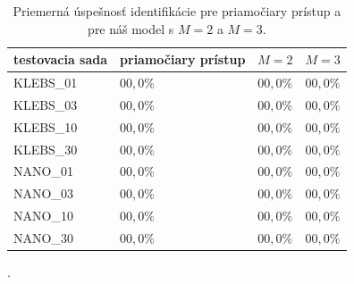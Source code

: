 \begin{table}[]
\centering
\caption{Priemerná úspešnosť identifikácie pre priamočiary prístup a pre náš model s $M=2$ a $M=3$.}
\label{tab:uspesnost_final}
\begin{tabular}{llll}
\hline
testovacia sada & priamočiary prístup & $M=2$     & $M=3$     \\ \hline
KLEBS\_01       & $00,0 \%$           & $00,0 \%$ & $00,0 \%$ \\
KLEBS\_03       & $00,0 \%$           & $00,0 \%$ & $00,0 \%$ \\
KLEBS\_10       & $00,0 \%$           & $00,0 \%$ & $00,0 \%$ \\
KLEBS\_30       & $00,0 \%$           & $00,0 \%$ & $00,0 \%$ \\
NANO\_01        & $00,0 \%$           & $00,0 \%$ & $00,0 \%$ \\
NANO\_03        & $00,0 \%$           & $00,0 \%$ & $00,0 \%$ \\
NANO\_10        & $00,0 \%$           & $00,0 \%$ & $00,0 \%$ \\
NANO\_30        & $00,0 \%$           & $00,0 \%$ & $00,0 \%$
\end{tabular}
\end{table}

.